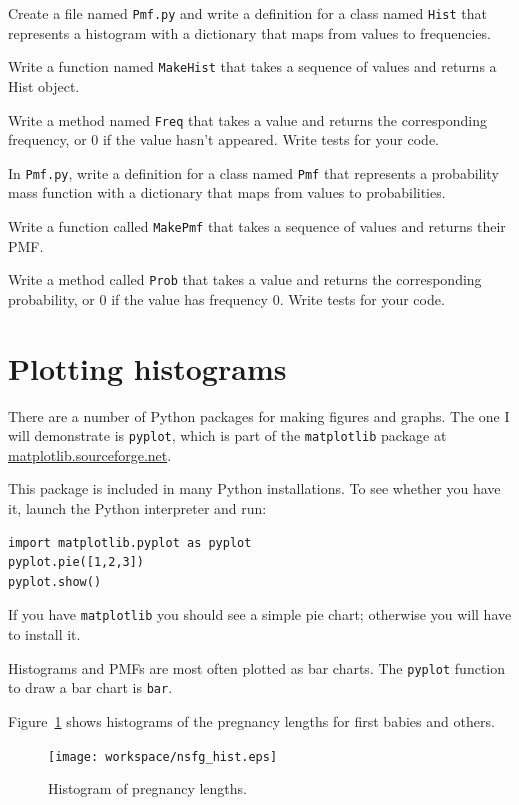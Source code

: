 \documentclass[12pt]{book}
\begin{document}
\begin{ex}
Create a file named {\tt Pmf.py} and write a definition for a class
named {\tt Hist} that represents a histogram with a dictionary
that maps from values to frequencies.

Write a function named {\tt MakeHist} that takes a sequence of
values and returns a Hist object.

Write a method named {\tt Freq} that takes a value and returns
the corresponding frequency, or 0
if the value hasn't appeared.  Write tests for your code.
\end{ex}


\begin{ex}
In {\tt Pmf.py}, write a definition for a class named {\tt Pmf} that
represents a probability mass function with a dictionary that maps
from values to probabilities.

Write a function called {\tt MakePmf} that takes a sequence of
values and returns their PMF.

Write a method called {\tt Prob} that
takes a value and returns the corresponding probability, or 0
if the value has frequency 0.  Write tests for your code.
\end{ex}


\section{Plotting histograms}

There are a number of Python packages for making figures and graphs.
The one I will demonstrate is {\tt pyplot}, which is part of
the {\tt matplotlib} package at \url{matplotlib.sourceforge.net}.

This package is included in many Python installations.  To see whether
you have it, launch the Python interpreter and run:

\begin{verbatim}
import matplotlib.pyplot as pyplot
pyplot.pie([1,2,3])
pyplot.show()
\end{verbatim}

If you have {\tt matplotlib} you should see a simple pie chart;
otherwise you will have to install it.

Histograms and PMFs are most often plotted as bar charts.  The
{\tt pyplot} function to draw a bar chart is {\tt bar}.

Figure~\ref{nsfg_hist} shows histograms of the pregnancy lengths for
first babies and others.

\begin{figure}
\centerline{\texttt{[image: workspace/nsfg\_hist.eps]}}
\caption{Histogram of pregnancy lengths.}
\label{nsfg_hist}
\end{figure}
\end{document}
